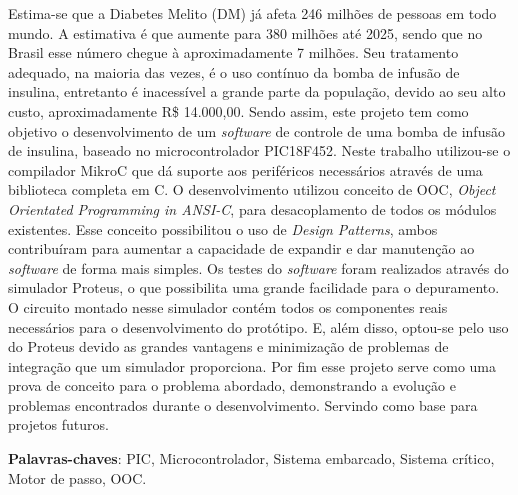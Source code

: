 \documentclass[	12pt, Times, openright, twoside, a4paper, english, brazil]{abntex2}
\begin{document}
\begin{resumo}
Estima-se que a Diabetes Melito (DM) já afeta 246 milhões de pessoas em todo mundo. A estimativa é que aumente para 380 milhões até 2025, sendo que no Brasil esse número chegue à aproximadamente 7 milhões. Seu tratamento adequado, na maioria das vezes, é o uso contínuo da bomba de infusão de insulina, entretanto é inacessível a grande parte da população, devido ao seu alto custo, aproximadamente R\$ 14.000,00. Sendo assim, este projeto tem como objetivo o desenvolvimento de um \emph{software} de controle de uma bomba de infusão de insulina, baseado no microcontrolador PIC18F452. Neste trabalho utilizou-se o compilador MikroC que dá suporte aos periféricos necessários através de uma biblioteca completa em C. O desenvolvimento utilizou conceito de OOC, \emph{Object Orientated Programming in ANSI-C}, para desacoplamento de todos os módulos existentes. Esse conceito possibilitou o uso de \emph{Design Patterns}, ambos contribuíram para aumentar a capacidade de expandir e dar manutenção ao \emph{software} de forma mais simples. Os testes do \emph{software} foram realizados através do simulador Proteus, o que possibilita uma grande facilidade para o depuramento. O circuito montado nesse simulador contém todos os componentes reais necessários para o desenvolvimento do protótipo. E, além disso, optou-se pelo uso do Proteus devido as grandes vantagens e minimização de problemas de integração que um simulador proporciona. Por fim esse projeto serve como uma prova de conceito para o problema abordado, demonstrando a evolução e problemas encontrados durante o desenvolvimento. Servindo como base para projetos futuros.

 
 \vspace{\onelineskip}
    
 \noindent
 \textbf{Palavras-chaves}: PIC, Microcontrolador, Sistema embarcado, Sistema crítico, Motor de passo, OOC.
\end{resumo}
\end{document}
